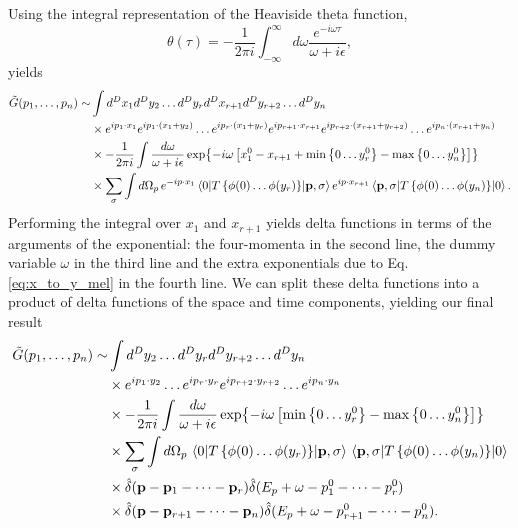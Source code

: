 \documentclass{article}
\numberwithin{equation}{section}
\begin{document}
Using the integral representation of the Heaviside theta function,
\begin{equation}
    \theta(\tau) = - \frac{1}{2\pi i}\int_{-\infty}^\infty d\omega \frac{e^{-i\omega\tau}}{\omega + i\epsilon},
\end{equation}
yields
\begin{equation}
\begin{aligned}
    \tilde{G}(p_1, \dots, p_n) \sim &\int d^Dx_1 d^Dy_2 \dots d^Dy_r d^Dx_{r+1} d^Dy_{r+2} \dots d^Dy_n \\
    &\times e^{ip_1\cdot x_1} e^{ip_1 \cdot (x_1 + y_2)} \dots e^{ip_r \cdot (x_1 + y_r)} e^{ip_{r+1} \cdot x_{r+1}} e^{ip_{r+2} \cdot (x_{r+1} + y_{r+2})} \dots e^{ip_n \cdot (x_{r+1} + y_n)}\\
    &\times -\frac{1}{2\pi i} \int \frac{d\omega}{\omega+i\epsilon} \exp{-i\omega\left[ x_1^0 - x_{r+1} + \min\left\{0 \dots y_r^0\right\} - \max\left\{0 \dots y_n^0\right\}\right]} \\
    &\times \sum_\sigma \int d\Omega_p \, e^{-ip \cdot x_1}\mel{0}{T\left\{\phi(0) \dots \phi(y_r)\right\} }{\vb{p}, \sigma} e^{ip \cdot x_{r+1}}\mel{\vb{p}, \sigma}{T \left\{\phi(0) \dots \phi(y_n)\right\}}{0}.
\end{aligned}
\end{equation}
Performing the integral over $x_1$ and $x_{r+1}$ yields delta functions in terms of the arguments of the exponential: the four-momenta in the second line, the dummy variable $\omega$ in the third line and the extra exponentials due to Eq. \ref{eq:x_to_y_mel} in the fourth line. We can split these delta functions into a product of delta functions of the space and time components, yielding our final result
\begin{equation}
\begin{aligned}
    \tilde{G}(p_1, \dots, p_n) \sim &\int d^Dy_2 \dots d^Dy_r d^Dy_{r+2} \dots d^Dy_n \\
    &\times e^{ip_1 \cdot y_2} \dots e^{ip_r \cdot y_r}  e^{ip_{r+2} \cdot y_{r+2}} \dots e^{ip_n \cdot y_n}\\
    &\times -\frac{1}{2\pi i} \int \frac{d\omega}{\omega+i\epsilon} \exp{-i\omega\left[\min\left\{0 \dots y_r^0\right\} - \max\left\{0 \dots y_n^0\right\}\right]} \\
    &\times \sum_\sigma \int d\Omega_p \,\mel{0}{T\left\{\phi(0) \dots \phi(y_r)\right\} }{\vb{p}, \sigma} \mel{\vb{p}, \sigma}{T \left\{\phi(0) \dots \phi(y_n)\right\}}{0} \\
    &\times \hat{\delta}(\vb{p} - \vb{p}_1 - \dots - \vb{p}_r) \hat{\delta}(E_p + \omega - p_1^0 - \dots - p_r^0) \\
    &\times \hat{\delta}(\vb{p} - \vb{p}_{r+1} - \dots - \vb{p}_n) \hat{\delta}(E_p + \omega - p_{r+1}^0 - \dots - p_n^0).
\end{aligned}
\end{equation}
\end{document}
